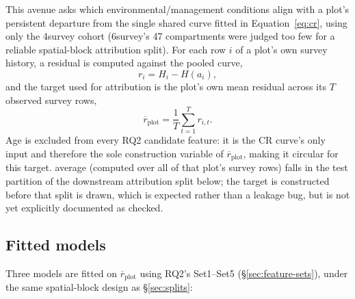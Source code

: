 \documentclass[11pt,a4paper]{report}
\begin{document}
This avenue asks which environmental/management conditions align with a plot's persistent
departure from the single shared curve fitted in Equation~\ref{eq:cr}, using only the 4survey
cohort (6survey's 47 compartments were judged too few for a reliable spatial-block attribution
split). For each row $i$ of a plot's own survey history, a residual is computed against the
pooled curve,
\begin{equation}
r_i = H_i - H(a_i),
\label{eq:cr-residual}
\end{equation}
and the target used for attribution is the plot's own mean residual across its $T$ observed
survey rows,
\begin{equation}
\overline{r}_{\text{plot}} = \frac{1}{T}\sum_{t=1}^{T} r_{i,t}.
\label{eq:mean-cr-residual}
\end{equation}
Age is excluded from every RQ2 candidate feature: it is the CR curve's only input and therefore
the sole construction variable of $\overline{r}_{\text{plot}}$, making it circular for this
target. %
average (computed over all of that plot's survey rows) falls in the test partition of the
downstream attribution split below; the target is constructed before that split is drawn, which
is expected rather than a leakage bug, but is not yet explicitly documented as checked.

\subsection{Fitted models}

Three models are fitted on $\overline{r}_{\text{plot}}$ using RQ2's Set1--Set5
(\S\ref{sec:feature-sets}), under the same spatial-block design as \S\ref{sec:splits}:
\end{document}
